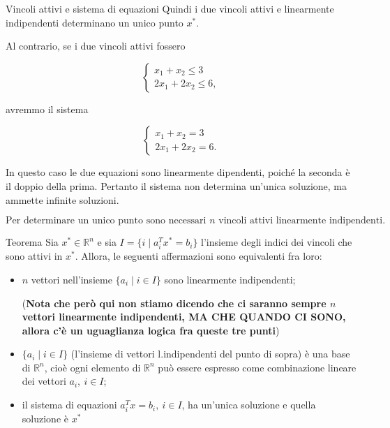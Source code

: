 \begin{example}{Vincoli attivi e sistema di equazioni}
Quindi i due vincoli attivi e linearmente indipendenti determinano
un unico punto $x^*$.

\medskip

Al contrario, se i due vincoli attivi fossero

\[
\begin{cases}
x_1+x_2\le3\\
2x_1+2x_2\le6,
\end{cases}
\]

avremmo il sistema

\[
\begin{cases}
x_1+x_2=3\\
2x_1+2x_2=6.
\end{cases}
\]

In questo caso le due equazioni sono linearmente dipendenti, poiché
la seconda è il doppio della prima. Pertanto il sistema non determina
un'unica soluzione, ma ammette infinite soluzioni.

\[
\boxed{
\text{Per determinare un unico punto sono necessari $n$ vincoli attivi
linearmente indipendenti.}
}
\]

\end{example}

\begin{theorem}{Teorema}
Sia $x^* \in \mathbb{R}^n$ e sia $I = \{i \mid a^T_i x^* = b_i\}$ l'insieme degli indici dei vincoli che sono attivi in $x^*$. Allora, le seguenti affermazioni sono equivalenti fra loro:

\begin{itemize}
    \item $n$ vettori nell'insieme $\{a_i \mid i \in I\}$ sono linearmente indipendenti;
    
    (\textbf{Nota che però qui non stiamo dicendo che ci saranno sempre $n$ vettori linearmente indipendenti, MA CHE QUANDO CI SONO, allora c'è un uguaglianza logica fra queste tre punti})

    \item $\{a_i \mid i \in I\}$ (l'insieme di vettori l.indipendenti del punto di sopra) è una base di $\mathbb{R}^n$, cioè ogni elemento di $\mathbb{R}^n$ può essere espresso come combinazione lineare dei vettori $a_i, \ i \in I$;
    
    \item il sistema di equazioni $a^T_i x = b_i, \ i \in I$, ha un'unica soluzione e quella soluzione è $x^*$
\end{itemize}
\end{theorem}

